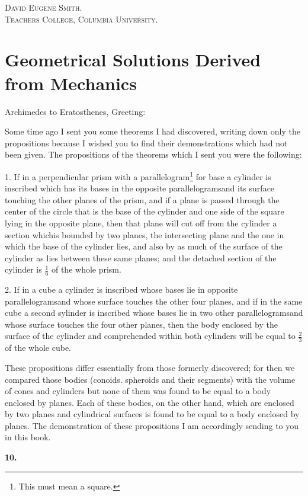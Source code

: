 \documentclass[oneside,12pt]{book}
\begin{document}
\begin{flushright}
    \textsc{David Eugene Smith.\\Teachers College, Columbia University.}
\end{flushright}

\mainmatter
\chapter{Geometrical Solutions Derived from Mechanics}
Archimedes to Eratosthenes, Greeting: \par 

Some time ago I sent you some theorems I had discovered, writing down only the propositions because I wished you to find their demonstrations which had not been given. The propositions of the theorems which I sent you were the following: \par 

1. If in a perpendicular prism with a parallelogram\footnote{This must mean a square.} for base a cylinder is inscribed which has its bases in the opposite parallelograms\footnotemark[1] and its surface touching the other planes of the prism, and if a plane is passed through the center of the circle that is the base of the cylinder and one side of the square lying in the opposite plane, then that plane will cut off from the cylinder a section whichis bounded by two planes, the intersecting plane and the one in which the base of the cylinder lies, and also by as much of the surface of the cylinder as lies between these same planes; and the detached section of the cylinder is $\frac{1}{6}$ of the whole prism. \par 

2. If in a cube a cylinder is inscribed whose bases lie in opposite parallelograms\footnotemark[1] and whose surface touches the other four planes, and if in the same cube a second sylinder is inscribed whose bases lie in two other parallelograms\footnotemark[1] and whose surface touches the four other planes, then the body enclosed by the surface of the cylinder and comprehended within both cylinders will be equal to $\frac{2}{3}$ of the whole cube. \par 

These propositions differ essentially from those formerly discovered; for then we compared those bodies (conoids. spheroids and their segments) with the volume of cones and cylinders but none of them was found to be equal to a body enclosed by planes. Each of these bodies, on the other hand, which are enclosed by two planes and cylindrical surfaces is found to be equal to a body enclosed by planes. The demonstration of these propositions I am accordingly sending to you in this book. \par 

\textbf{10.} 
\end{document}
